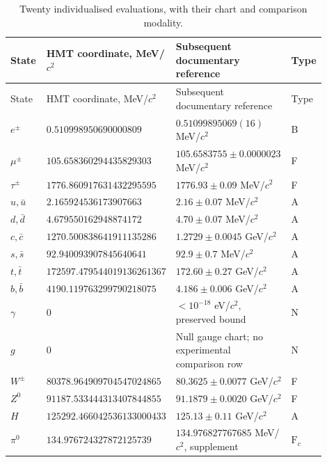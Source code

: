 \begingroup
\small
\setlength{\tabcolsep}{3pt}
\begin{longtable}{p{0.13\linewidth}p{0.32\linewidth}p{0.38\linewidth}p{0.07\linewidth}}
\caption{Twenty individualised evaluations, with their chart and comparison modality.}
\label{tab:vi-evaluaciones-veinte}\\
\toprule
State & HMT coordinate, MeV/\(c^2\) & Subsequent documentary reference & Type\\
\midrule
\endfirsthead
\toprule
State & HMT coordinate, MeV/\(c^2\) & Subsequent documentary reference & Type\\
\midrule
\endhead
\bottomrule
\endfoot
\(e^\pm\) & \(0.510998950\allowbreak690000809\) & \(0.51099895069(16)\) MeV/\(c^2\) & B\\
\(\mu^\pm\) & \(105.658360294\allowbreak435829303\) & \(105.6583755\pm0.0000023\) MeV/\(c^2\) & F\\
\(\tau^\pm\) & \(1776.860917631\allowbreak432295595\) & \(1776.93\pm0.09\) MeV/\(c^2\) & F\\
\(u,\bar u\) & \(2.165924536\allowbreak173907663\) & \(2.16\pm0.07\) MeV/\(c^2\) & A\\
\(d,\bar d\) & \(4.679550162\allowbreak948874172\) & \(4.70\pm0.07\) MeV/\(c^2\) & A\\
\(c,\bar c\) & \(1270.500838641\allowbreak911135286\) & \(1.2729\pm0.0045\) GeV/\(c^2\) & A\\
\(s,\bar s\) & \(92.940093907\allowbreak845640641\) & \(92.9\pm0.7\) MeV/\(c^2\) & A\\
\(t,\bar t\) & \(172597.479544019\allowbreak136261367\) & \(172.60\pm0.27\) GeV/\(c^2\) & A\\
\(b,\bar b\) & \(4190.119763299\allowbreak790218075\) & \(4.186\pm0.006\) GeV/\(c^2\) & A\\
\(\gamma\) & \(0\) & \(<10^{-18}\) eV/\(c^2\), preserved bound & N\\
\(g\) & \(0\) & Null gauge chart; no experimental comparison row & N\\
\(W^\pm\) & \(80378.964909704\allowbreak547024865\) & \(80.3625\pm0.0077\) GeV/\(c^2\) & F\\
\(Z^0\) & \(91187.533444313\allowbreak407844855\) & \(91.1879\pm0.0020\) GeV/\(c^2\) & F\\
\(H\) & \(125292.466042536\allowbreak133000433\) & \(125.13\pm0.11\) GeV/\(c^2\) & A\\
\(\pi^0\) & \(134.976724327\allowbreak872125739\) & \(134.976827767685\) MeV/\(c^2\), supplement & \(\mathrm F_c\)\\

\end{longtable}

